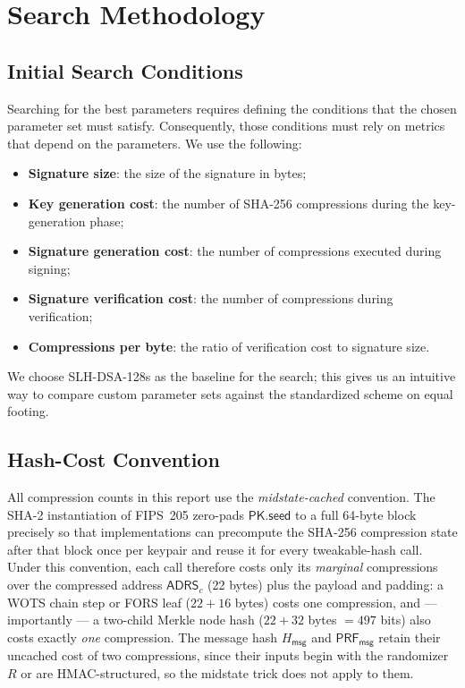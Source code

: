 \section{Search Methodology}

\subsection{Initial Search Conditions}
Searching for the best parameters requires defining the conditions that the chosen parameter set must satisfy. Consequently, those conditions must rely on metrics that depend on the parameters. We use the following:

\begin{itemize}
    \item \textbf{Signature size}: the size of the signature in bytes;
    \item \textbf{Key generation cost}: the number of SHA-256 compressions during the key-generation phase;
    \item \textbf{Signature generation cost}: the number of compressions executed during signing;
    \item \textbf{Signature verification cost}: the number of compressions during verification;
    \item \textbf{Compressions per byte}: the ratio of verification cost to signature size.
\end{itemize}

We choose SLH-DSA-128s as the baseline for the search; this gives us an intuitive way to compare custom parameter sets against the standardized scheme on equal footing.

\subsection{Hash-Cost Convention} \label{sec:hash-convention}
All compression counts in this report use the \emph{midstate-cached} convention. The SHA-2 instantiation of FIPS~205 zero-pads $\mathsf{PK.seed}$ to a full 64-byte block precisely so that implementations can precompute the SHA-256 compression state after that block once per keypair and reuse it for every tweakable-hash call. Under this convention, each call therefore costs only its \emph{marginal} compressions over the compressed address $\mathsf{ADRS}_c$ (22 bytes) plus the payload and padding: a WOTS chain step or FORS leaf ($22 + 16$ bytes) costs one compression, and — importantly — a two-child Merkle node hash ($22 + 32$ bytes $= 497$ bits) also costs exactly \emph{one} compression. The message hash $H_{\mathsf{msg}}$ and $\mathsf{PRF}_{\mathsf{msg}}$ retain their uncached cost of two compressions, since their inputs begin with the randomizer $R$ or are HMAC-structured, so the midstate trick does not apply to them.

